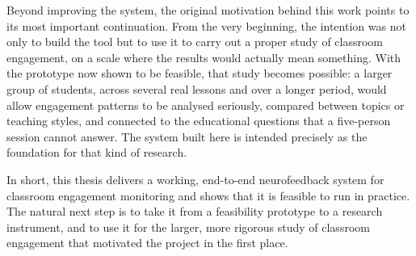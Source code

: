 Beyond improving the system, the original motivation behind this work points to its most important continuation. From the very beginning, the intention was not only to build the tool but to use it to carry out a proper study of classroom engagement, on a scale where the results would actually mean something. With the prototype now shown to be feasible, that study becomes possible: a larger group of students, across several real lessons and over a longer period, would allow engagement patterns to be analysed seriously, compared between topics or teaching styles, and connected to the educational questions that a five-person session cannot answer. The system built here is intended precisely as the foundation for that kind of research.

In short, this thesis delivers a working, end-to-end neurofeedback system for classroom engagement monitoring and shows that it is feasible to run in practice. The natural next step is to take it from a feasibility prototype to a research instrument, and to use it for the larger, more rigorous study of classroom engagement that motivated the project in the first place.
